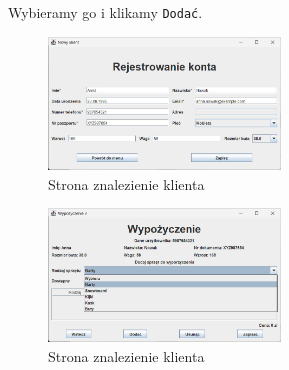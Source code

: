     Wybieramy go i klikamy \texttt{Dodać}.
    \begin{figure}[h]
        \centering
        \includegraphics[width=0.55\textwidth]{figures/add.jpg}
        \caption{Strona znalezienie klienta}
    \end{figure}

    \begin{figure}[h]
        \centering
        \includegraphics[width=0.55\textwidth]{figures/wypo4.jpg}
        \caption{Strona znalezienie klienta}
    \end{figure}

